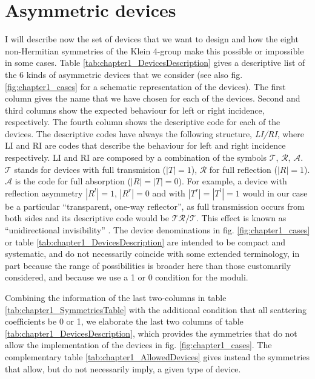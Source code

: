 \section{Asymmetric devices\label{sec:chapter1_AsymmetricDevices}}

I will describe now the set of devices that we want to design and how the eight non-Hermitian symmetries of the Klein 4-group make this possible or impossible in some cases. Table \ref{tab:chapter1_DevicesDescription} gives a descriptive list of the 6 kinds of asymmetric devices that we consider (see also fig. \ref{fig:chapter1_cases} for a schematic representation of the devices). The first column gives the name that we have chosen for each of the devices. Second and third columns show the expected behaviour for left or right incidence, respectively. The fourth column shows the descriptive code for each of the devices. The descriptive codes have always the following structure, \textit{LI/RI}, where LI and RI are codes that describe the behaviour for left and right incidence respectively. LI and RI are composed by a combination of the symbols $\mathcal{T}$, $\mathcal{R}$, $\mathcal{A}$. $\mathcal{T}$ stands for devices with full transmision ($|T|=1$), $\mathcal{R}$ for full reflection ($|R| = 1$). $\mathcal{A}$ is the code for full absorption ($|R|=|T|=0$). For example, a device with reflection asymmetry $|R^l|=1$, $|R^r|=0$ and with $|T^r|=|T^l|=1$ would in our case be a particular ``transparent, one-way reflector'', as full transmission occurs from both sides and its descriptive code would be $\mathcal{T}\mathcal{R}/\mathcal{T}$. This effect is known as ``unidirectional invisibility'' \cite{Lin2011,Yin2013}. The device denominations in fig. \ref{fig:chapter1_cases} or table \ref{tab:chapter1_DevicesDescription} are intended to be compact and systematic, and do not necessarily coincide with some extended terminology, in part because the range of possibilities is broader here than those customarily considered, and because we use a 1 or 0 condition for the moduli.

Combining the information of the last two-columns in table \ref{tab:chapter1_SymmetriesTable} with the additional condition that all scattering coefficients
be 0 or 1, we elaborate the last two columns of table \ref{tab:chapter1_DevicesDescription}, which provides the symmetries
that do not allow the implementation of the devices in fig. \ref{fig:chapter1_cases}. The complementary table \ref{tab:chapter1_AllowedDevices} gives instead the symmetries that allow, but do not necessarily imply, a given type of device.




